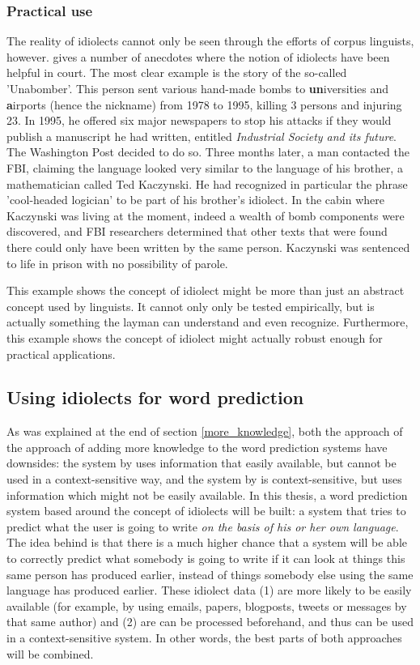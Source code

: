 \documentclass[12pt]{article}
\begin{document}
\subsubsection{Practical use}
The reality of idiolects cannot only be seen through the efforts of corpus linguists, however.  gives a number of anecdotes where the notion of idiolects have been helpful in court. The most clear example is the story of the so-called 'Unabomber'. This person sent various hand-made bombs to \textbf{un}iversities and \textbf{a}irports (hence the nickname) from 1978 to 1995, killing 3 persons and injuring 23. In 1995, he offered six major newspapers to stop his attacks if they would publish a manuscript he had written, entitled \emph{Industrial Society and its future}. The Washington Post decided to do so. Three months later, a man contacted the FBI, claiming the language looked very similar to the language of his brother, a mathematician called Ted Kaczynski. He had recognized in particular the phrase 'cool-headed logician' to be part of his brother's idiolect. In the cabin where Kaczynski was living at the moment, indeed a wealth of bomb components were discovered, and FBI researchers determined that other texts that were found there could only have been written by the same person. Kaczynski was sentenced to life in prison with no possibility of parole. 

This example shows the concept of idiolect might be more than just an abstract concept used by linguists. It cannot only only be tested empirically, but is actually something the layman can understand and even recognize. Furthermore, this example shows the concept of idiolect might actually robust enough for practical applications.

\subsection{Using idiolects for word prediction} \label{linking}
As was explained at the end of section \ref{more_knowledge}, both the approach of  the approach  of adding more knowledge to the word prediction systems have downsides: the system by \citeauthor{vandenbosch11} uses information that easily available, but cannot be used in a context-sensitive way, and the system by  is context-sensitive, but uses information which might not be easily available. In this thesis, a word prediction system based around the concept of idiolects will be built: a system that tries to predict what the user is going to write \emph{on the basis of his  or her own language}. The idea behind is that there is a much higher chance that a system will be able to correctly predict what somebody is going to write if it can look at things this same person has produced earlier, instead of things somebody else using the same language has produced earlier. These idiolect data (1) are more likely to be easily available (for example, by using emails, papers, blogposts, tweets or messages by that same author) and (2) are can be processed beforehand, and thus can be used in a context-sensitive system. In other words, the best parts of both approaches will be combined.
\end{document}
